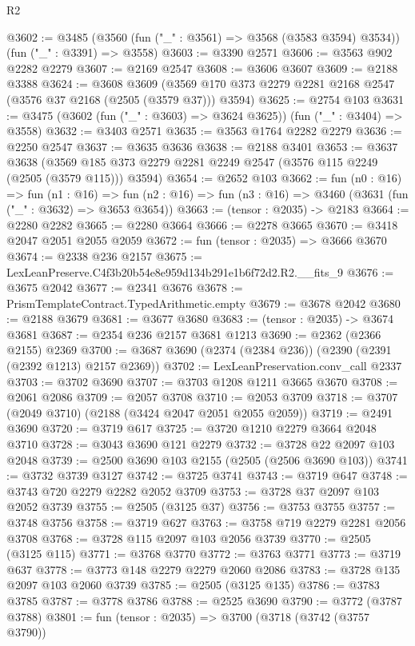 \begin{lexlean}{R2}
\begin{coremodule}
@3602 := @3485 (@3560 (fun ("_" : @3561) => @3568 (@3583 @3594) @3534)) (fun ("_" : @3391) => @3558)
@3603 := @3390 @2571
@3606 := @3563 @902 @2282 @2279
@3607 := @2169 @2547
@3608 := @3606 @3607
@3609 := @2188 @3388
@3624 := @3608
    @3609
    (@3569 @170 @373 @2279 @2281 @2168 @2547 (@3576 @37 @2168 (@2505 (@3579 @37))) @3594)
@3625 := @2754 @103
@3631 := @3475 (@3602 (fun ("_" : @3603) => @3624 @3625)) (fun ("_" : @3404) => @3558)
@3632 := @3403 @2571
@3635 := @3563 @1764 @2282 @2279
@3636 := @2250 @2547
@3637 := @3635 @3636
@3638 := @2188 @3401
@3653 := @3637
    @3638
    (@3569 @185 @373 @2279 @2281 @2249 @2547 (@3576 @115 @2249 (@2505 (@3579 @115))) @3594)
@3654 := @2652 @103
@3662 := fun (n0 : @16) =>
  fun (n1 : @16) =>
  fun (n2 : @16) => fun (n3 : @16) => @3460 (@3631 (fun ("_" : @3632) => @3653 @3654))
@3663 := (tensor : @2035) -> @2183
@3664 := @2280 @2282
@3665 := @2280 @3664
@3666 := @2278 @3665
@3670 := @3418 @2047 @2051 @2055 @2059
@3672 := fun (tensor : @2035) => @3666 @3670
@3674 := @2338 @236 @2157
@3675 := LexLeanPreserve.C4f3b20b54e8e959d134b291e1b6f72d2.R2.__fits_9
@3676 := @3675 @2042
@3677 := @2341 @3676
@3678 := PrismTemplateContract.TypedArithmetic.empty
@3679 := @3678 @2042
@3680 := @2188 @3679
@3681 := @3677 @3680
@3683 := (tensor : @2035) -> @3674 @3681
@3687 := @2354 @236 @2157 @3681 @1213
@3690 := @2362 (@2366 @2155) @2369
@3700 := @3687 @3690 (@2374 (@2384 @236)) (@2390 (@2391 (@2392 @1213) @2157 @2369))
@3702 := LexLeanPreservation.conv_call @2337
@3703 := @3702 @3690
@3707 := @3703 @1208 @1211 @3665 @3670
@3708 := @2061 @2086
@3709 := @2057 @3708
@3710 := @2053 @3709
@3718 := @3707 (@2049 @3710) (@2188 (@3424 @2047 @2051 @2055 @2059))
@3719 := @2491 @3690
@3720 := @3719 @617
@3725 := @3720 @1210 @2279 @3664 @2048 @3710
@3728 := @3043 @3690 @121 @2279
@3732 := @3728 @22 @2097 @103 @2048
@3739 := @2500 @3690 @103 @2155 (@2505 (@2506 @3690 @103))
@3741 := @3732 @3739 @3127
@3742 := @3725 @3741
@3743 := @3719 @647
@3748 := @3743 @720 @2279 @2282 @2052 @3709
@3753 := @3728 @37 @2097 @103 @2052 @3739
@3755 := @2505 (@3125 @37)
@3756 := @3753 @3755
@3757 := @3748 @3756
@3758 := @3719 @627
@3763 := @3758 @719 @2279 @2281 @2056 @3708
@3768 := @3728 @115 @2097 @103 @2056 @3739
@3770 := @2505 (@3125 @115)
@3771 := @3768 @3770
@3772 := @3763 @3771
@3773 := @3719 @637
@3778 := @3773 @148 @2279 @2279 @2060 @2086
@3783 := @3728 @135 @2097 @103 @2060 @3739
@3785 := @2505 (@3125 @135)
@3786 := @3783 @3785
@3787 := @3778 @3786
@3788 := @2525 @3690
@3790 := @3772 (@3787 @3788)
@3801 := fun (tensor : @2035) =>
  @3700
    (@3718
      (@3742 (@3757 @3790))

\end{coremodule}
\end{lexlean}
